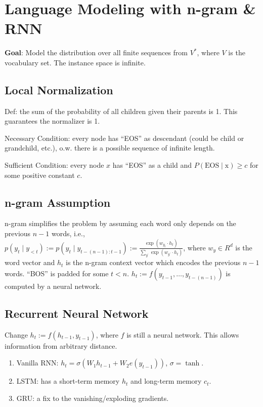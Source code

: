\section{Language Modeling with n-gram \& RNN}

\textbf{Goal}: Model the distribution over all finite sequences from $V^*$, where $V$ is the vocabulary set. The instance space is infinite.

\subsection*{Local Normalization}

Def: the sum of the probability of all children given their parents is 1. This guarantees the normalizer is 1.

Necessary Condition: every node has ``EOS'' as descendant (could be child or grandchild, etc.), o.w. there is a possible sequence of infinite length.

Sufficient Condition: every node $x$ has ``EOS'' as a child and $P(\text{EOS}\mid \text{x})\ge c$ for some positive constant $c$.

\subsection*{n-gram Assumption}

n-gram simplifies the problem by assuming each word only depends on the previous $n-1$ words, i.e.,
$p(y_t\mid y_{<t}) := p(y_t\mid y_{t-(n-1):t-1}) := \frac{\exp(w_{y_t}\cdot h_t)}{\sum_{y^\prime} \exp(w_{y^\prime}\cdot h_t)}$, where $w_y\in R^d$ is the word vector and $h_t$ is the n-gram context vector which encodes the previous $n-1$ words. ``BOS'' is padded for some $t<n$. $h_t:=f(y_{t-1}, \dots, y_{t-(n-1)})$ is computed by a neural network.

\subsection*{Recurrent Neural Network}

Change $h_t:=f(h_{t-1}, y_{t-1})$, where $f$ is still a neural network. This allows information from arbitrary distance.

\begin{enumerate}
    \item Vanilla RNN: $h_t=\sigma(W_1 h_{t-1}+W_2 e(y_{t-1}))$, $\sigma=\tanh$.
    \item LSTM: has a short-term memory $h_t$ and long-term memory $c_t$.
    \item GRU: a fix to the vanishing/exploding gradients.
\end{enumerate}
